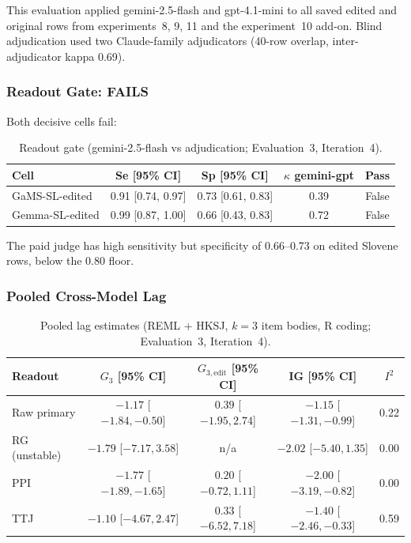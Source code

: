 \documentclass[11pt,letterpaper]{article}
\begin{document}
This evaluation applied gemini-2.5-flash and gpt-4.1-mini to all saved edited and original rows from experiments~8, 9, 11 and the experiment~10 add-on. Blind adjudication used two Claude-family adjudicators (40-row overlap, inter-adjudicator kappa 0.69).

\subsubsection{Readout Gate: FAILS}

Both decisive cells fail:

\begin{table}[!htbp]
\centering
\caption{Readout gate (gemini-2.5-flash vs adjudication; Evaluation~3, Iteration~4).}
\label{tab:readout_gate_eval3}
\begin{tabular}{lcccc}
\toprule
Cell & Se [95\% CI] & Sp [95\% CI] & $\kappa$ gemini-gpt & Pass \\
\midrule
GaMS-SL-edited & 0.91 [0.74, 0.97] & 0.73 [0.61, 0.83] & 0.39 & False \\
Gemma-SL-edited & 0.99 [0.87, 1.00] & 0.66 [0.43, 0.83] & 0.72 & False \\
\bottomrule
\end{tabular}
\end{table}

The paid judge has high sensitivity but specificity of 0.66--0.73 on edited Slovene rows, below the 0.80 floor.

\subsubsection{Pooled Cross-Model Lag}

\begin{table}[!htbp]
\centering
\caption{Pooled lag estimates (REML + HKSJ, $k = 3$ item bodies, R coding; Evaluation~3, Iteration~4).}
\label{tab:pooled_lag}
\begin{tabular}{lcccc}
\toprule
Readout & $G_3$ [95\% CI] & $G_{3,\text{edit}}$ [95\% CI] & IG [95\% CI] & $I^2$ \\
\midrule
Raw primary & $-1.17$ [$-1.84, -0.50$] & $0.39$ [$-1.95, 2.74$] & $-1.15$ [$-1.31, -0.99$] & 0.22 \\
RG (unstable) & $-1.79$ [$-7.17, 3.58$] & n/a & $-2.02$ [$-5.40, 1.35$] & 0.00 \\
PPI & $-1.77$ [$-1.89, -1.65$] & $0.20$ [$-0.72, 1.11$] & $-2.00$ [$-3.19, -0.82$] & 0.00 \\
TTJ & $-1.10$ [$-4.67, 2.47$] & $0.33$ [$-6.52, 7.18$] & $-1.40$ [$-2.46, -0.33$] & 0.59 \\
\bottomrule
\end{tabular}
\end{table}
\end{document}
